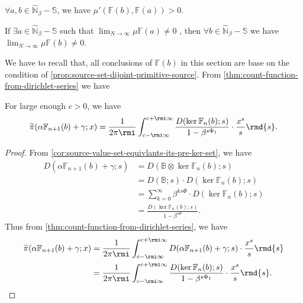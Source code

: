 \begin{corollary}
	$\forall a, b \in \widehat{\mathbb{N}}_\beta - \mathbb{S}$, we have $\mu'(\mathbb{F}(b), \mathbb{F}(a)) > 0$.
\end{corollary}
\begin{corollary}
	If $\exists a \in \widehat{\mathbb{N}}_\beta - \mathbb{S}$ such that $\lim_{N\to\infty}\mu\mathbb{F}(a) \ne 0$ , then
	$\forall b\in\widehat{\mathbb{N}}_\beta - \mathbb{S}$ we have $\lim_{N\to\infty}\mu\mathbb{F}(b) \ne 0$.
\end{corollary}
We have to recall that, all conclusions of $\mathbb{F}(b)$ in this section are base on the condition of \cref{prop:source-set-dijoint-primitive-source}.
From \cref{thm:count-function-from-dirichlet-series} we have
\begin{corollary}
    For large enough $c > 0$, we have
    \[ \widetilde{\pi}(\alpha\mathbb{F}_{n+1}(b) + \gamma;x) = \frac{1}{2\pi\rmi}\int_{c-\rmi\infty}^{c+\rmi\infty}\frac{D(\ker\mathbb{F}_{n}(b);s)}{1- \beta^{s\Phi_1}}\cdot\frac{x^{s}}{s}\rmd{s}. \]
\end{corollary}
\begin{proof}
	From \cref{cor:source-value-set-equivlants-its-pre-ker-set}, we have 
	\begin{align*}
		D(\alpha\mathbb{F}_{n+1}(b) + \gamma; s) &= D(\mathbb{B}\otimes \ker\mathbb{F}_{n}(b); s) \\
		&= D(\mathbb{B};s)\cdot D(\ker\mathbb{F}_{n}(b);s) \\
		&= \sum_{k=0}^{\infty}\beta^{ks\Phi}\cdot D(\ker\mathbb{F}_{n}(b);s) \\
		&= \frac{D(\ker\mathbb{F}_{n}(b);s)}{1 - \beta^{s\Phi}}.
	\end{align*}
	Thus from \cref{thm:count-function-from-dirichlet-series}, we have
	\begin{align*}
		\widetilde{\pi}(\alpha\mathbb{F}_{n+1}(b) + \gamma;x) &= \frac{1}{2\pi\rmi}\int_{c-\rmi\infty}^{c+\rmi\infty}D(\alpha\mathbb{F}_{n+1}(b) + \gamma; s)\cdot\frac{x^{s}}{s}\rmd{s} \\
		&= \frac{1}{2\pi\rmi}\int_{c-\rmi\infty}^{c+\rmi\infty}\frac{D(\ker\mathbb{F}_{n}(b);s)}{1- \beta^{s\Phi_1}}\cdot\frac{x^{s}}{s}\rmd{s}.
	\end{align*}
\end{proof}

